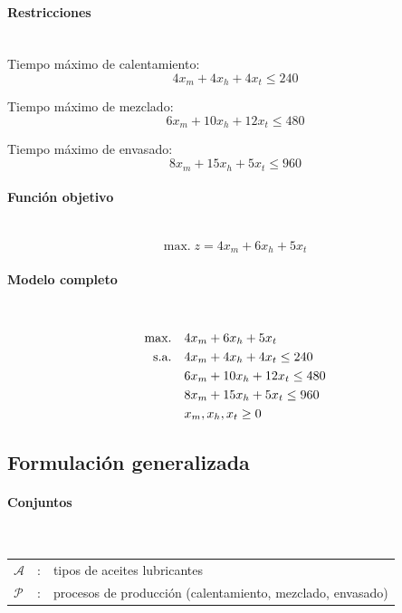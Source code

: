 \paragraph{Restricciones}\mbox{}\\

Tiempo máximo de calentamiento:
\begin{equation}
4x_m + 4x_h + 4x_t \leq 240
\end{equation}

Tiempo máximo de mezclado:
\begin{equation}
6x_m + 10x_h + 12x_t \leq 480
\end{equation}

Tiempo máximo de envasado:
\begin{equation}
8x_m + 15x_h + 5x_t \leq 960
\end{equation}

\paragraph{Función objetivo}\mbox{}\\
\begin{equation}
\mbox{max.}\; z = 4x_m + 6x_h + 5x_t
\end{equation}

\paragraph{Modelo completo}\mbox{}\\
\begin{align}
\mbox{max.}\quad & 4x_m + 6x_h + 5x_t \notag \\
\mbox{s.a.}\quad 
& 4x_m + 4x_h + 4x_t \leq 240 \notag \\
& 6x_m + 10x_h + 12x_t \leq 480 \notag \\
& 8x_m + 15x_h + 5x_t \leq 960 \notag \\
& x_m, x_h, x_t \geq 0
\end{align}

\subsection{Formulación generalizada}

\paragraph{Conjuntos}\mbox{}\\
\begin{tabular}{lcl}
$\mathcal{A}$ & : & tipos de aceites lubricantes \\
$\mathcal{P}$ & : & procesos de producción (calentamiento, mezclado, envasado) \\
\end{tabular}

